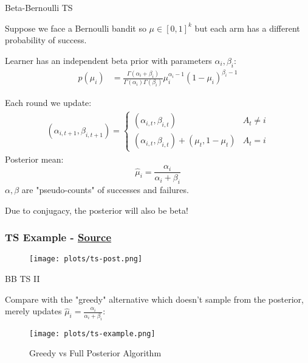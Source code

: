 \documentclass[aspectratio=169,xcolor=dvipsnames]{beamer}
\begin{document}
\begin{frame}{Beta-Bernoulli TS}

    Suppose we face a Bernoulli bandit so $\mu \in [0,1]^k$ but 
    each arm has a different probability of success. 


    Learner has an independent beta prior with parameters $\alpha_i, \beta_i$:
    \begin{align*}
        p(\mu_i) &= \frac{\Gamma(\alpha_i + \beta_i)}{\Gamma(\alpha_i) \Gamma(\beta_i)} 
        \mu_i^{\alpha_i - 1} (1 - \mu_i)^{\beta_i - 1}
    \end{align*}

    Each round we update:
    \begin{align*}
        (\alpha_{i, t+1}, \beta_{i, t+1}) =\begin{cases}
            (\alpha_{i, t}, \beta_{i, t}) &  A_t \neq i \\
            (\alpha_{i, t}, \beta_{i, t}) + (\mu_t, 1 - \mu_t) & A_t = i
        \end{cases} 
    \end{align*}
   Posterior mean:
    $$
   \hat{\mu}_i = \frac{\alpha_i}{\alpha_i + \beta_i}
   $$
    $\alpha, \beta$ are "pseudo-counts" of successes and failures.

    Due to conjugacy, the posterior will also be beta!

\end{frame}


\begin{frame}
    \frametitle{TS Example  - \href{https://towardsdatascience.com/thompson-sampling-fc28817eacb8}{Source}}

   \begin{figure}[htbp]
       \centering
       \texttt{[image: plots/ts-post.png]}
   \end{figure} 

\end{frame}

\begin{frame}{BB TS II}


    Compare with the "greedy" alternative which doesn't sample from the posterior, 
    merely updates $\hat{\mu}_i = \frac{\alpha_i}{\alpha_i + \beta_i}$:

    \begin{figure}[htbp]
        \centering
       \texttt{[image: plots/ts-example.png]} 
        \caption{Greedy vs Full Posterior Algorithm}
    \end{figure} 

\end{frame}
\end{document}
